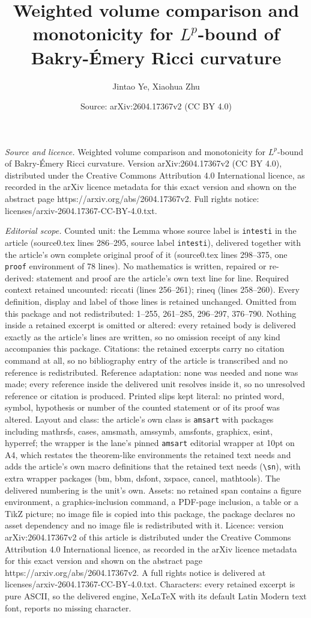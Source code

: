 \documentclass[10pt,a4paper]{amsart}
\title[Weighted volume comparison and monotonicity for $L^p$-bound ]{Weighted volume comparison and monotonicity for $L^p$-bound of Bakry-\'{E}mery Ricci curvature}
\author{Jintao Ye, Xiaohua Zhu}
\date{Source: arXiv:2604.17367v2 (CC BY 4.0)}
\begin{document}
\maketitle

\noindent\emph{Source and licence.} Weighted volume comparison and monotonicity for $L^p$-bound of Bakry-\'{E}mery Ricci curvature. Version arXiv:2604.17367v2 (CC BY 4.0), distributed under the Creative Commons Attribution 4.0 International licence, as recorded in the arXiv licence metadata for this exact version and shown on the abstract page https://arxiv.org/abs/2604.17367v2. Full rights notice: licenses/arxiv-2604.17367-CC-BY-4.0.txt.\par\smallskip

\noindent\textit{Editorial scope.} Counted unit: the Lemma whose source label is \texttt{intesti} in the article (source0.tex lines 286--295, source label \texttt{intesti}), delivered together with the article's own complete original proof of it (source0.tex lines 298--375, one \texttt{proof} environment of 78 lines). No mathematics is written, repaired or re-derived: statement and proof are the article's own text line for line. Required context retained uncounted: riccati (lines 256--261); rineq (lines 258--260). Every definition, display and label of those lines is retained unchanged. Omitted from this package and not redistributed: 1--255, 261--285, 296--297, 376--790. Nothing inside a retained excerpt is omitted or altered: every retained body is delivered exactly as the article's lines are written, so no omission receipt of any kind accompanies this package. Citations: the retained excerpts carry no citation command at all, so no bibliography entry of the article is transcribed and no reference is redistributed. Reference adaptation: none was needed and none was made; every reference inside the delivered unit resolves inside it, so no unresolved reference or citation is produced. Printed slips kept literal: no printed word, symbol, hypothesis or number of the counted statement or of its proof was altered. Layout and class: the article's own class is \texttt{amsart} with packages including mathrsfs, cases, amsmath, amssymb, amsfonts, graphicx, esint, hyperref; the wrapper is the lane's pinned \texttt{amsart} editorial wrapper at 10pt on A4, which restates the theorem-like environments the retained text needs and adds the article's own macro definitions that the retained text needs (\texttt{\textbackslash sn}), with extra wrapper packages (bm, bbm, dsfont, xspace, cancel, mathtools). The delivered numbering is the unit's own. Assets: no retained span contains a figure environment, a graphics-inclusion command, a PDF-page inclusion, a table or a TikZ picture; no image file is copied into this package, the package declares no asset dependency and no image file is redistributed with it. Licence: version arXiv:2604.17367v2 of this article is distributed under the Creative Commons Attribution 4.0 International licence, as recorded in the arXiv licence metadata for this exact version and shown on the abstract page https://arxiv.org/abs/2604.17367v2. A full rights notice is delivered at licenses/arxiv-2604.17367-CC-BY-4.0.txt. Characters: every retained excerpt is pure ASCII, so the delivered engine, XeLaTeX with its default Latin Modern text font, reports no missing character.
\end{document}
